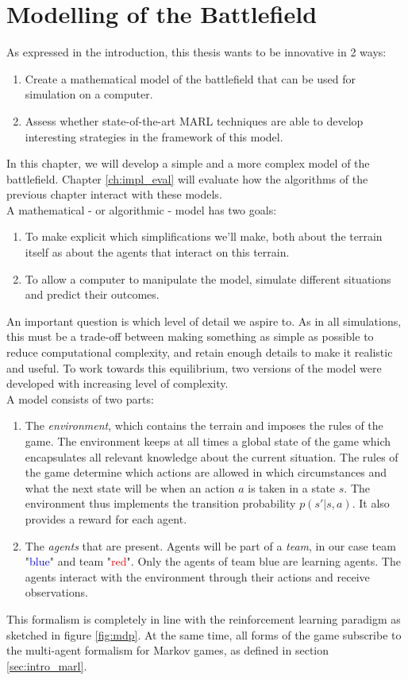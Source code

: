 \chapter{Modelling of the Battlefield}
\label{ch:modelling}
As expressed in the introduction, this thesis wants to be innovative in 2 ways:
\begin{enumerate}
    \item Create a mathematical model of the battlefield that can be used for simulation on a computer.
    \item Assess whether state-of-the-art MARL techniques are able to develop interesting strategies in the framework of this model.
\end{enumerate}
In this chapter, we will develop a simple and a more complex model of the battlefield.  Chapter \ref{ch:impl_eval} will evaluate how the algorithms of the previous chapter interact with these models.\\
A mathematical - or algorithmic - model has two goals:
\begin{enumerate}
    \item To make explicit which simplifications we'll make, both about the terrain itself as about the agents that interact on this terrain.
    \item To allow a computer to manipulate the model, simulate different situations and predict their outcomes.
\end{enumerate}
An important question is which level of detail we aspire to. As in all simulations, this must be a trade-off between making something as simple as possible to reduce computational complexity, and retain enough details to make it realistic and useful. To work towards this equilibrium, two versions of the model were developed with increasing level of complexity.\\
A model consists of two parts:
\begin{enumerate}
    \item The \emph{environment}, which contains the terrain and imposes the rules of the game. The environment keeps at all times a global state of the game which encapsulates all relevant knowledge about the current situation. The rules of the game determine which actions are allowed in which circumstances and what the next state will be when an action $a$ is taken in a state $s$. The environment thus implements the transition probability $p(s'|s, a)$. It also provides a reward for each agent.
    \item The \emph{agents} that are present. Agents will be part of a \emph{team}, in our case team "\textcolor{blue}{blue}" and team "\textcolor{red}{red}". Only the agents of team blue are learning agents. The agents interact with the environment through their actions and receive observations.
\end{enumerate}
This formalism is completely in line with the reinforcement learning paradigm as sketched in figure \ref{fig:mdp}. At the same time, all forms of the game subscribe to the multi-agent formalism for Markov games, as defined in section \ref{sec:intro_marl}.

